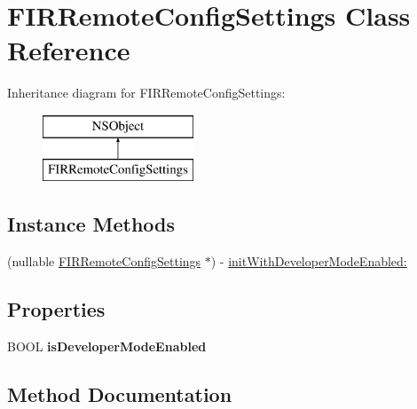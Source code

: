 \hypertarget{interface_f_i_r_remote_config_settings}{}\section{F\+I\+R\+Remote\+Config\+Settings Class Reference}
\label{interface_f_i_r_remote_config_settings}
Inheritance diagram for F\+I\+R\+Remote\+Config\+Settings\+:\begin{figure}[H]
\begin{center}
\leavevmode
\includegraphics[height=2.000000cm]{interface_f_i_r_remote_config_settings}
\end{center}
\end{figure}
\subsection*{Instance Methods}
\begin{DoxyCompactItemize}
\item 
(nullable \hyperlink{interface_f_i_r_remote_config_settings}{F\+I\+R\+Remote\+Config\+Settings} $\ast$) -\/ \hyperlink{interface_f_i_r_remote_config_settings_ab4a7cb6739e740cb5a746cc3c32e7f3b}{init\+With\+Developer\+Mode\+Enabled\+:}
\end{DoxyCompactItemize}
\subsection*{Properties}
\begin{DoxyCompactItemize}
\item 
\hypertarget{interface_f_i_r_remote_config_settings_a03fd6e89a8e7793c7cc29093af84589c}{}B\+O\+O\+L {\bfseries is\+Developer\+Mode\+Enabled}\label{interface_f_i_r_remote_config_settings_a03fd6e89a8e7793c7cc29093af84589c}

\end{DoxyCompactItemize}


\subsection{Method Documentation}
\hypertarget{interface_f_i_r_remote_config_settings_ab4a7cb6739e740cb5a746cc3c32e7f3b}{}
